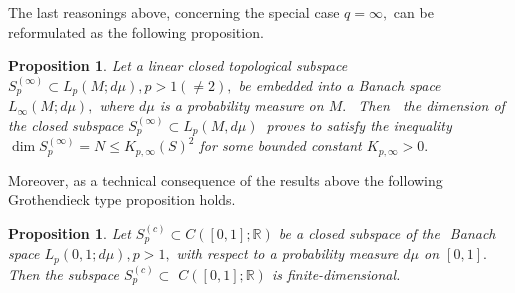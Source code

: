 \documentclass[pdflatex,sn-mathphys-num]{sn-jnl}%
\theoremstyle{thmstyleone}%
\newtheorem{proposition}[theorem]{Proposition}%
\theoremstyle{thmstyletwo}%
\theoremstyle{thmstylethree}%
\begin{document}
The last reasonings above, concerning the special case $q=\infty ,$ can be
reformulated as the following proposition.

\begin{proposition}
	Let a linear closed topological subspace $S_{p}^{(\infty )}\subset
	L_{p}(M;d\mu ),p>1(\neq 2),$ be embedded into a Banach space $%
	L_{\infty }(M;d\mu ),$ where $d\mu $ is a probability measure on $M.$
	\ Then $\ $ the dimension of the closed subspace $S_{p}^{(\infty )}\subset
	L_{p}(M,d\mu )\ $ proves to satisfy the inequality $\dim S_{p}^{(\infty
		)}=N\leq K_{p,\infty }(S)^{2}$  for some bounded constant $K_{p,\infty
	}>0.$
\end{proposition}

Moreover, as a technical consequence of the results above the following
Grothendieck type \cite{Grot} proposition holds.

\begin{proposition}
	Let $S_{p}^{(c)}\subset C([0,1];\mathbb{R})$ be a closed subspace of the $%
	\mathbb{ }$ Banach space $L_{p}(0,1;d\mu ),p>1,$ with respect to a
	probability measure $d\mu $ on $[0,1].$ Then the subspace $%
	S_{p}^{(c)}\subset $ $C([0,1];\mathbb{R})$ is finite-dimensional.
\end{proposition}
\end{document}

